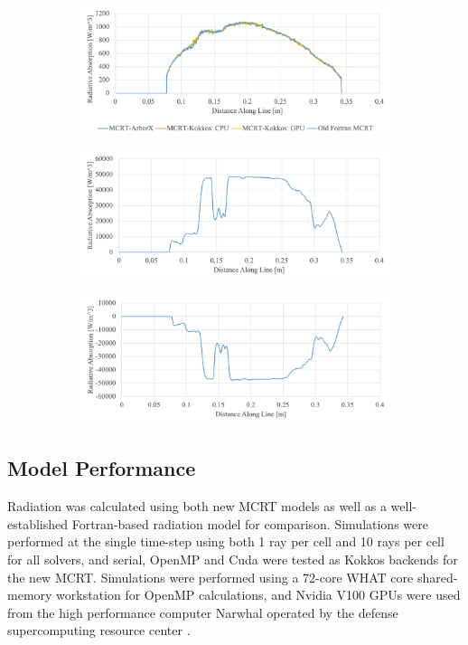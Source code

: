 \begin{figure}
  \begin{subfigure}{1\textwidth}
  \includegraphics[width=\linewidth]{figures/ch4/LineComparison_RadAbs.png}
  \caption{}
  \label{fig:BFS_RadAbs}
  \end{subfigure}
  \begin{subfigure}{1\textwidth}
  \includegraphics[width=\linewidth]{figures/ch4/LineComparison_RadEmi.png}
  \caption{}
  \label{fig:BFS_RadEmi}
  \end{subfigure}
  \begin{subfigure}{1\textwidth}
  \includegraphics[width=\linewidth]{figures/ch4/LineComparison_RadSrc.png}
  \caption{}
  \label{fig:BFS_RadSrc}
  \end{subfigure}
  \label{fig:PPcomp}
\end{figure}


\subsection{Model Performance}
Radiation was calculated using both new MCRT models as well as a well-established Fortran-based radiation model for comparison. Simulations were performed at the single time-step using both 1 ray per cell and 10 rays per cell for all solvers, and serial, OpenMP and Cuda were tested as Kokkos backends for the new MCRT. 
Simulations were performed using a 72-core WHAT core shared-memory workstation for OpenMP calculations, and Nvidia V100 GPUs were used from the high performance computer Narwhal operated by the defense supercomputing resource center \cite{something}.

